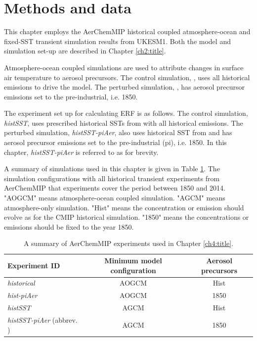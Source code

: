 \section{Methods and data}

This chapter employs the AerChemMIP historical coupled atmosphere-ocean and fixed-SST transient simulation results from UKESM1. Both the model and simulation set-up are described in Chapter \ref{ch2:title}.

Atmosphere-ocean coupled simulations are used to attribute changes in surface air temperature to aerosol precursors. The control simulation, \hist{}, uses all historical emissions to drive the model. The perturbed simulation, \histpiaer{}, has aerosol precursor emissions set to the pre-industrial, i.e. 1850.

The experiment set up for calculating ERF is as follows. The control simulation, \textit{histSST}, uses prescribed historical SSTs from \hist{} with all historical emissions. The perturbed simulation, \textit{histSST-piAer}, also uses historical SST from \hist{} and has aerosol precursor emissions set to the pre-industrial (pi), i.e. 1850. In this chapter, \textit{histSST-piAer} is referred to as \sstpiaer{} for brevity.

A summary of simulations used in this chapter is given in Table \ref{ch4:tab:simulation}. The simulation configurations with all historical transient experiments from AerChemMIP that experiments cover the period between 1850 and 2014. "AOGCM" means atmosphere-ocean coupled simulation. "AGCM" means atmosphere-only simulation. "Hist" means the concentration or emission should evolve as for the CMIP historical simulation. "1850" means the concentrations or emissions should be fixed to the year 1850.

\begin{table}
   \caption[AerChemMIP experiments used in Chapter \ref{ch4:title}]{A summary of AerChemMIP experiments used in Chapter \ref{ch4:title}.}
   \label{ch4:tab:simulation}
   \centering
   \begin{tabular}{l c c}
    \toprule
     Experiment ID & Minimum model configuration & Aerosol precursors\\
    \midrule
     \textit{historical}      & AOGCM & Hist\\
     \textit{hist-piAer}      & AOGCM & 1850\\
     \textit{histSST}         & AGCM & Hist\\
     \textit{histSST-piAer} (abbrev. \sstpiaer{})  & AGCM & 1850\\
     \bottomrule
   \end{tabular}
\end{table}


